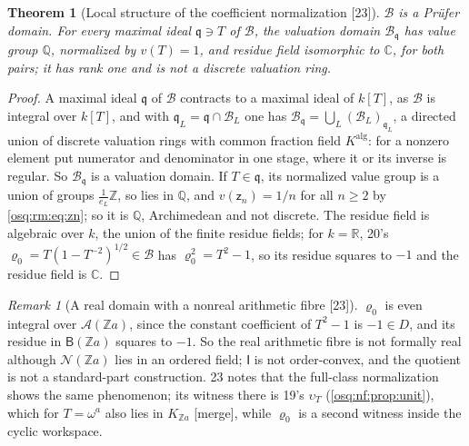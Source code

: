 \documentclass[11pt,letterpaper]{article}
\numberwithin{equation}{section}
\newtheorem{theorem}{Theorem}[section]
\theoremstyle{definition}
\theoremstyle{remark}
\newtheorem{remark}[remark]{Remark}
\theoremstyle{plain}
\newcommand{\Z}{\mathbb Z}
\newcommand{\Q}{\mathbb Q}
\newcommand{\R}{\mathbb R}
\newcommand{\C}{\mathbb C}
\newcommand{\A}{\mathcal A}          %
\newcommand{\NN}{\mathcal N}         %
\newcommand{\src}[1]{\textup{\textsf{[#1]}}}
\newcommand{\merge}{\textup{\textsf{[merge]}}}
\begin{document}
\begin{theorem}[Local structure of the coefficient normalization \src{23}]\label{osq:rm:thm:localtype}
$\mathscr B$ is a Pr\"ufer domain. For every maximal ideal $\mathfrak q\ni T$ of $\mathscr B$, the valuation domain $\mathscr B_{\mathfrak q}$ has value group $\Q$,
normalized by $v(T)=1$, and residue field isomorphic to $\C$, for both pairs; it has rank one and is not a discrete valuation ring.
\end{theorem}
\begin{proof}
A maximal ideal $\mathfrak q$ of $\mathscr B$ contracts to a maximal ideal of $k[T]$, as $\mathscr B$ is integral over $k[T]$, and with $\mathfrak q_L=\mathfrak q\cap\mathscr B_L$
one has $\mathscr B_{\mathfrak q}=\bigcup_L(\mathscr B_L)_{\mathfrak q_L}$, a directed union of discrete valuation rings with common fraction field $K^{\mathrm{alg}}$: for
a nonzero element put numerator and denominator in one stage, where it or its inverse is regular. So $\mathscr B_{\mathfrak q}$ is a valuation domain. If
$T\in\mathfrak q$, its normalized value group is a union of groups $\frac1{e_L}\Z$, so lies in $\Q$, and $v(\mathsf z_n)=1/n$ for all $n\ge2$ by
\eqref{osq:rm:eq:zn}; so it is $\Q$, Archimedean and not discrete. The residue field is algebraic over $k$, the union of the finite residue fields; for
$k=\R$, 20's $\varrho_0=T(1-T^{-2})^{1/2}\in\mathscr B$ has $\varrho_0^2=T^2-1$, so its residue squares to $-1$ and the residue field is $\C$.
\end{proof}

\begin{remark}[A real domain with a nonreal arithmetic fibre \src{23}]\label{osq:rm:rem:nonreal}
$\varrho_0$ is even integral over $\A(\Z a)$, since the constant coefficient of $T^2-1$ is $-1\in D$, and its residue in $\mathsf B(\Z a)$ squares to $-1$.
So the real arithmetic fibre is not formally real although $\NN(\Z a)$ lies in an ordered field; $\mathsf I$ is not order-convex, and the quotient is not a
standard-part construction. 23 notes that the full-class normalization shows the same phenomenon; its witness there is 19's $\upsilon_T$
(\cref{osq:nf:prop:unit}), which for $T=\omega^a$ also lies in $K_{\Z a}$ \merge, while $\varrho_0$ is a second witness inside the cyclic workspace.
\end{remark}
\end{document}
